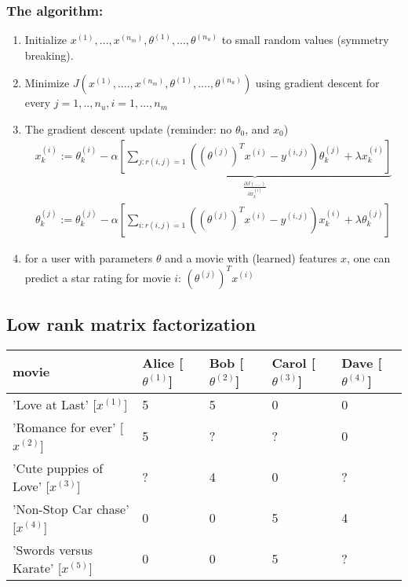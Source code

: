 \documentclass[a4paper,12pt]{report}
\begin{document}
\subsubsection{The algorithm:}
\begin{enumerate}
\item Initialize $x^{(1)}, ..., x^{(n_m)}, \theta^{(1)}, ..., \theta^{(n_u)}$ to small random values (symmetry breaking).
\item Minimize $J(x^{(1)}, ...., x^{(n_m)}, \theta^{(1)}, ...., \theta^{(n_u)})$ using gradient descent for every $j=1, .., n_u, i=1,...,n_m$
\item The gradient descent update (reminder: no $\theta_0$, and $x_0$)
	\begin{align}
	x_k ^{(i)} :=  \theta_k ^{(i)} - \alpha \underbrace{\left[ \sum_{j:r(i,j)=1} \left( (\theta^{(j)})^T x^{(i)} - y^{(i,j)}\right) \theta_k ^{(j)} + \lambda x_k ^{(i)} \right]}_{\frac{\partial J(....)}{\partial x_k ^{(i)}}}
	\end{align}
	\begin{align}
	\theta_k ^{(j)} :=  \theta_k ^{(j)} - \alpha \left[ \sum_{i:r(i,j)=1} \left( (\theta^{(j)})^T x^{(i)}- y^{(i,j)}\right) x_k ^{(i)} + \lambda \theta_k ^{(j)}  \right]
	\end{align}
\item for a user with parameters $\theta$ and a movie with (learned) features $x$, one can predict a star rating for movie $i$: $(\theta^{(j)})^T x^{(i)}$
\end{enumerate}

\subsection{Low rank matrix factorization}

\begin{table}[H]
\begin{tabular}{|p{5cm}|p{2cm}|p{1.7cm}|p{2cm}|p{1.9cm}|}
\hline
movie & Alice [$\theta^{(1)}$]  & Bob [$\theta^{(2)}$]& Carol [$\theta^{(3)}$] & Dave [$\theta^{(4)}$] \\
\hline
'Love at Last' [$x^{(1)}$] & 5 & 5 & 0 & 0 \\
\hline
'Romance for ever' [$x^{(2)}$] & 5 & ? & ? & 0 \\
\hline
'Cute puppies of Love' [$x^{(3)}$] & ? & 4 & 0 & ?  \\
\hline
'Non-Stop Car chase' [$x^{(4)}$] & 0 & 0 & 5 & 4 \\
\hline
'Swords versus Karate' [$x^{(5)}$] & 0 & 0 & 5 & ? \\
\hline
\end{tabular}
\end{table}
\end{document}
